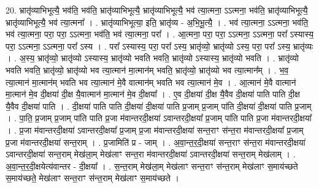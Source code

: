 \documentclass[17pt]{extarticle}
\begin{document}
20. भ्रातृ॑व्याभिभूत्यै॒ भव॑ति॒ भव॑ति॒ भ्रातृ॑व्याभिभूत्यै॒ भ्रातृ॑व्याभिभूत्यै॒ भव॑ त्या॒त्मना॒ ऽऽत्मना॒ भव॑ति॒ भ्रातृ॑व्याभिभूत्यै॒ भ्रातृ॑व्याभिभूत्यै॒ भव॑ त्या॒त्मना᳚ । . भ्रातृ॑व्याभिभूत्या॒ इति॒ भ्रातृ॑व्य - अ॒भि॒भू॒त्यै॒ । . भव॑ त्या॒त्मना॒ ऽऽत्मना॒ भव॑ति॒ भव॑ त्या॒त्मना॒ परा॒ परा॒ ऽऽत्मना॒ भव॑ति॒ भव॑ त्या॒त्मना॒ परा᳚ । . आ॒त्मना॒ परा॒ परा॒ ऽऽत्मना॒ ऽऽत्मना॒ परा᳚ ऽस्यास्य॒ परा॒ ऽऽत्मना॒ ऽऽत्मना॒ परा᳚ ऽस्य । . परा᳚ ऽस्यास्य॒ परा॒ परा᳚ ऽस्य॒ भ्रातृ॑व्यो॒ भ्रातृ॑व्यो ऽस्य॒ परा॒ परा᳚ ऽस्य॒ भ्रातृ॑व्यः । . अ॒स्य॒ भ्रातृ॑व्यो॒ भ्रातृ॑व्यो ऽस्यास्य॒ भ्रातृ॑व्यो भवति भवति॒ भ्रातृ॑व्यो ऽस्यास्य॒ भ्रातृ॑व्यो भवति । . भ्रातृ॑व्यो भवति भवति॒ भ्रातृ॑व्यो॒ भ्रातृ॑व्यो भव त्या॒त्मान॑ मा॒त्मान॑म् भवति॒ भ्रातृ॑व्यो॒ भ्रातृ॑व्यो भव त्या॒त्मान᳚म् । . भ॒व॒ त्या॒त्मान॑ मा॒त्मान॑म् भवति भव त्या॒त्मान॑ मे॒वै वात्मान॑म् भवति भव त्या॒त्मान॑ मे॒व । . आ॒त्मान॑ मे॒वै वात्मान॑ मा॒त्मान॑ मे॒व दी॒क्षया॑ दी॒क्ष यै॒वात्मान॑ मा॒त्मान॑ मे॒व दी॒क्षया᳚ । . ए॒व दी॒क्षया॑ दी॒क्ष यै॒वैव दी॒क्षया॑ पाति पाति दी॒क्ष यै॒वैव दी॒क्षया॑ पाति । . दी॒क्षया॑ पाति पाति दी॒क्षया॑ दी॒क्षया॑ पाति प्र॒जाम् प्र॒जाम् पा॑ति दी॒क्षया॑ दी॒क्षया॑ पाति प्र॒जाम् । . पा॒ति॒ प्र॒जाम् प्र॒जाम् पा॑ति पाति प्र॒जा म॑वान्तरदी॒क्षया॑ ऽवान्तरदी॒क्षया᳚ प्र॒जाम् पा॑ति पाति प्र॒जा म॑वान्तरदी॒क्षया᳚ । . प्र॒जा म॑वान्तरदी॒क्षया॑ ऽवान्तरदी॒क्षया᳚ प्र॒जाम् प्र॒जा म॑वान्तरदी॒क्षया॑ सन्त॒राꣳ स॑न्त॒रा म॑वान्तरदी॒क्षया᳚ प्र॒जाम् प्र॒जा म॑वान्तरदी॒क्षया॑ सन्त॒राम् । . प्र॒जामिति॑ प्र - जाम् । . अ॒वा॒न्त॒र॒दी॒क्षया॑ सन्त॒राꣳ स॑न्त॒रा म॑वान्तरदी॒क्षया॑ ऽवान्तरदी॒क्षया॑ सन्त॒राम् मेख॑ला॒म् मेख॑लाꣳ सन्त॒रा म॑वान्तरदी॒क्षया॑ ऽवान्तरदी॒क्षया॑ सन्त॒राम् मेख॑लाम् । . अ॒वा॒न्त॒र॒दी॒क्षयेत्य॑वान्तर - दी॒क्षया᳚ । . स॒न्त॒राम् मेख॑ला॒म् मेख॑लाꣳ सन्त॒राꣳ स॑न्त॒राम् मेख॑लाꣳ स॒माय॑च्छते स॒माय॑च्छते॒ मेख॑लाꣳ सन्त॒राꣳ स॑न्त॒राम् मेख॑लाꣳ स॒माय॑च्छते । \newline
\end{document}
